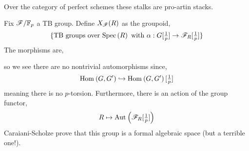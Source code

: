 \documentclass[12pt]{article}
\begin{document}
\begin{rmk}
Over the category of perfect schemes these stalks are pro-artin stacks.
\end{rmk}

\begin{defn}
Fix $\mathscr{F} / \mathbb{F}_p$ a TB group. Define $X_{\mathscr{F}}(R)$ as the groupoid,
\[ \{ \text{TB groups over } \mathrm{Spec}\left( R \right) \text{ with } \alpha : G[\tfrac{1}{p}] \to \mathscr{F}_R[\tfrac{1}{p}] \} \]
The morphisms are,
\begin{center}
\end{center}
so we see there are no nontrivial automorphisms since,
\[ \mathrm{Hom}_{} \left( G, G' \right) \hookrightarrow \mathrm{Hom}_{} \left( G, G' \right)[\tfrac{1}{p}] \]
meaning there is no $p$-torsion. Furthermore, there is an action of the group functor,
\[ R \mapsto \mathrm{Aut}_{} \left( \mathscr{F}_R[\tfrac{1}{p}] \right) \]
Caraiani-Scholze prove that this group is a formal algebraic space (but a terrible one!).
\end{defn}
\end{document}
